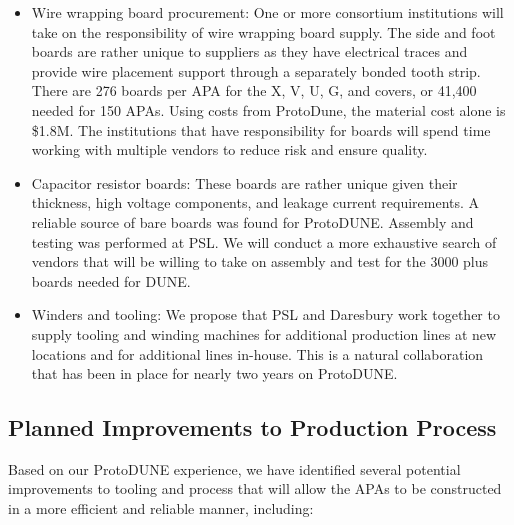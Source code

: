 \begin{itemize}
\item Wire wrapping board procurement: One or more consortium institutions will take on the responsibility of wire wrapping board supply. The side and foot boards are rather unique to suppliers as they have electrical traces and provide wire placement support through a separately bonded tooth strip. There are 276 boards per APA for the X, V, U, G, and covers, or 41,400 needed for 150 APAs. Using costs from ProtoDune, the material cost alone is \$1.8M. The institutions that have responsibility for boards will spend time working with multiple vendors to reduce risk and ensure quality. 
\item Capacitor resistor boards: These boards are rather unique given their thickness, high voltage components, and leakage current requirements. A reliable source of bare boards was found for ProtoDUNE. Assembly and testing was performed at PSL. We will conduct a more exhaustive search of vendors that will be willing to take on assembly and test for the 3000 plus boards needed for DUNE.
\item Winders and tooling: We propose that PSL and Daresbury work together to supply tooling and winding machines for additional production lines at new locations and for additional lines in-house. This is a natural collaboration that has been in place for nearly two years on ProtoDUNE.
\end{itemize}


\subsection{Planned Improvements to Production Process}

Based on our ProtoDUNE experience, we have identified several potential improvements to tooling and process that will allow the APAs to be constructed in a more efficient and reliable manner, including:

